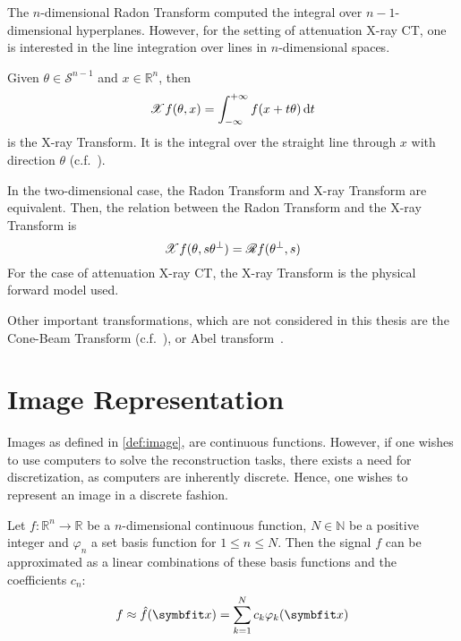 The \(n\)-dimensional Radon Transform computed the integral over \(n-1\)-dimensional hyperplanes.
However, for the setting of attenuation X-ray CT, one is interested in the line integration over
lines in \(n\)-dimensional spaces.

\begin{definition}
	Given \(\theta \in \mathscr{S}^{n-1}\) and \(x \in \mathbb{R}^n\), then
	\[ \mathscr{X} f(\theta, x) = \int_{-\infty}^{+\infty} f(x + t \theta) \, \mathrm{d}t\]
	is the X-ray Transform. It is the integral over the straight line through \(x\) with
	direction \(\theta\) (c.f.~\cite{natterer_mathematics_1986,solmon_x-ray_1976}).
\end{definition}

In the two-dimensional case, the Radon Transform and X-ray Transform are equivalent.
Then, the relation between the Radon Transform and the X-ray Transform is
\[\mathscr{X} f(\theta, s\theta^\perp) = \mathscr{R} f(\theta^\perp, s)\]
For the case of attenuation X-ray CT, the X-ray Transform is the physical forward model used.


Other important transformations, which are not considered in this thesis are the Cone-Beam Transform
(c.f.~\cite[Chapter~2]{carpio_inverse_2008}), or Abel transform~\cite[Chapter~4.16]{buzug_computed_2008}.

\chapter{Image Representation}\label{chap:image_representation}

Images as defined in \autoref{def:image}, are continuous functions. However, if one wishes to use
computers to solve the reconstruction tasks, there exists a need for discretization, as computers
are inherently discrete. Hence, one wishes to represent an image in a discrete fashion.

\begin{definition}
	\label{def:permissible_representation}
	Let \(f\colon \mathbb{R}^n \to \mathbb{R}\) be a \(n\)-dimensional continuous function,
	\(N \in \mathbb{N}\) be a positive integer and \(\varphi_n\) a set basis function for
	\(1 \leq n \leq N\). Then the signal \(f\) can be approximated as a linear combinations
	of these basis functions and the coefficients \(c_n\):
	\[ f \approx \near{f}(\mvec{x}) = \sum_{k=1}^{N} c_k \varphi_k(\mvec{x}) \]
\end{definition}

